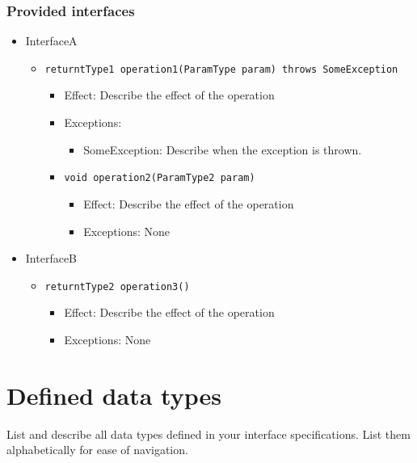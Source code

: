 \documentclass[a4paper,10pt]{article}
\begin{document}
\subsubsection*{Provided interfaces}
\begin{itemize}
    \item InterfaceA
    \begin{itemize}
        \item \texttt{returntType1 operation1(ParamType param) throws SomeException}
        \begin{itemize}
            \item Effect: Describe the effect of the operation
            \item Exceptions:
            \begin{itemize}
                \item SomeException: Describe when the exception is thrown.
            \end{itemize}

            \item \texttt{void operation2(ParamType2 param)}
            \begin{itemize}
                \item Effect: Describe the effect of the operation
                \item Exceptions: None
            \end{itemize}
        \end{itemize}
    \end{itemize}

    \item InterfaceB
    \begin{itemize}
        \item \texttt{returntType2 operation3()}
        \begin{itemize}
            \item Effect: Describe the effect of the operation
            \item Exceptions: None
        \end{itemize}
    \end{itemize}
\end{itemize}

\section{Defined data types}\label{app:datatypes}
List and describe all data types defined in your interface specifications. List
them alphabetically for ease of navigation.
\end{document}
